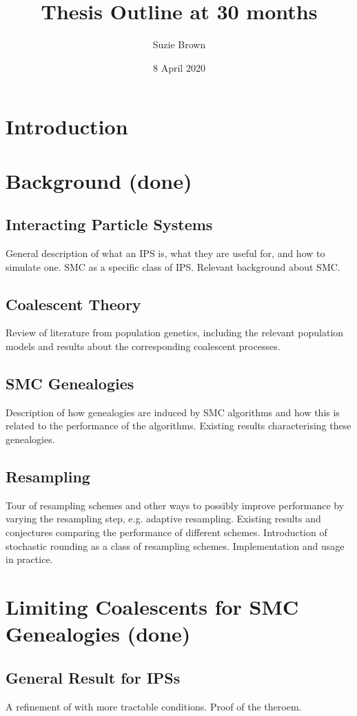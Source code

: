 \documentclass{article}
\title{Thesis Outline at 30 months}
\author{Suzie Brown}
\date{8 April 2020}
\begin{document}
\maketitle

\section{Introduction}

\section{Background (done)}
\subsection{Interacting Particle Systems}
General description of what an IPS is, what they are useful for, and how to simulate one. SMC as a specific class of IPS. Relevant background about SMC.
\subsection{Coalescent Theory}
Review of literature from population genetics, including the relevant population models and results about the corresponding coalescent processes.
\subsection{SMC Genealogies}
Description of how genealogies are induced by SMC algorithms and how this is related to the performance of the algorithms. Existing results characterising these genealogies.
\subsection{Resampling}
Tour of resampling schemes and other ways to possibly improve performance by varying the resampling step, e.g. adaptive resampling. Existing results and conjectures comparing the performance of different schemes. Introduction of stochastic rounding as a class of resampling schemes. Implementation and usage in practice. 

\section{Limiting Coalescents for SMC Genealogies (done)}
\subsection{General Result for IPSs}
A refinement of \citet[Theorem 1]{koskela2018} with more tractable conditions. Proof of the theroem. 
\end{document}
